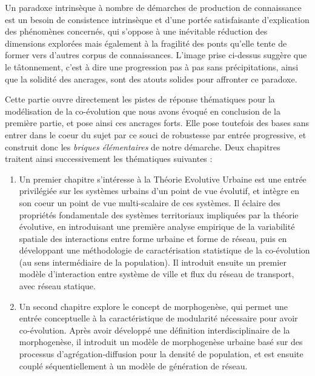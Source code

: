 

\bigskip



Un paradoxe intrinsèque à nombre de démarches de production de connaissance est un besoin de consistence intrinsèque et d'une portée satisfaisante d'explication des phénomènes concernés, qui s'oppose à une inévitable réduction des dimensions explorées mais également à la fragilité des ponts qu'elle tente de former vers d'autres corpus de connaissances. L'image prise ci-dessus suggère que le tâtonnement, c'est à dire une progression pas à pas sans précipitations, ainsi que la solidité des ancrages, sont des atouts solides pour affronter ce paradoxe.


Cette partie ouvre directement les pistes de réponse thématiques pour la modélisation de la co-évolution que nous avons évoqué en conclusion de la première partie, et pose ainsi ces ancrages forts. Elle pose toutefois des bases sans entrer dans le coeur du sujet par ce souci de robustesse par entrée progressive, et construit donc les \emph{briques élémentaires} de notre démarche. Deux chapitres traitent ainsi successivement les thématiques suivantes :
\begin{enumerate}
	\item Un premier chapitre s'intéresse à la Théorie Evolutive Urbaine est une entrée privilégiée sur les systèmes urbains d'un point de vue évolutif, et intègre en son coeur un point de vue multi-scalaire de ces systèmes. Il éclaire des propriétés fondamentale des systèmes territoriaux impliquées par la théorie évolutive, en introduisant une première analyse empirique de la variabilité spatiale des interactions entre forme urbaine et forme de réseau, puis en développant une méthodologie de caractérisation statistique de la co-évolution (au sens intermédiaire de la population). Il introduit ensuite un premier modèle d'interaction entre système de ville et flux du réseau de transport, avec réseau statique.
	\item Un second chapitre explore le concept de morphogenèse, qui permet une entrée conceptuelle à la caractéristique de modularité nécessaire pour avoir co-évolution. Après avoir développé une définition interdisciplinaire de la morphogenèse, il introduit un modèle de morphogenèse urbaine basé sur des processus d'agrégation-diffusion pour la densité de population, et est ensuite couplé séquentiellement à un modèle de génération de réseau.
\end{enumerate}







